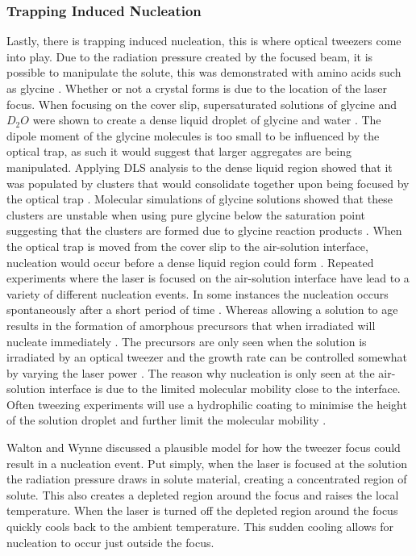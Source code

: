 \subsubsection{Trapping Induced Nucleation}
Lastly, there is trapping induced nucleation, this is where optical 
tweezers come into play. Due to the radiation pressure created by 
the focused beam, it is possible to manipulate the solute, this was 
demonstrated with amino acids such as glycine \cite{Tsuboi2009}. 
Whether or not a crystal forms is due to the location of the laser 
focus. When focusing on the cover slip, supersaturated solutions 
of glycine and $D_2O$ were shown to create a dense liquid droplet 
of glycine and water \cite{Yuyama2010, Yuyama2012}. The dipole 
moment of the glycine molecules is too small to be influenced by 
the optical trap, as such it would suggest that larger aggregates 
are being manipulated. Applying DLS analysis to the dense liquid 
region showed that it was populated by clusters that would 
consolidate together upon being focused by the optical trap 
\cite{Gowayed2021}. Molecular simulations of glycine solutions 
showed that these clusters are unstable when using pure glycine 
below the saturation point suggesting that the clusters are 
formed due to glycine reaction products \cite{Sweatman2022}. 
When the optical trap is moved from the cover slip to the 
air-solution interface, nucleation would occur before a dense 
liquid region could form \cite{Yuyama2010}. Repeated experiments 
where the laser is focused on the air-solution interface have 
lead to a variety of different nucleation events. In some 
instances the nucleation occurs spontaneously after a short 
period of time \cite{Yuyama2010}. Whereas allowing a solution to 
age results in the formation of amorphous precursors that when 
irradiated will nucleate immediately \cite{Liao2022}. The 
precursors are only seen when the solution is irradiated by an 
optical tweezer and the growth rate can be controlled somewhat 
by varying the laser power \cite{Liao2022}. The reason why 
nucleation is only seen at the air-solution interface is due 
to the limited molecular mobility close to the interface. 
Often tweezing experiments will use a hydrophilic coating to 
minimise the height of the solution droplet and further limit
the molecular mobility \cite{Yuyama2012, Gowayed2021}.

Walton and Wynne discussed a plausible model for how the tweezer 
focus could result in a nucleation event. Put simply, when the 
laser is focused at the solution the radiation pressure draws 
in solute material, creating a concentrated region of solute. 
This also creates a depleted region around the focus and raises 
the local temperature. When the laser is turned off the depleted 
region around the focus quickly cools back to the ambient 
temperature. This sudden cooling allows for nucleation to occur
just outside the focus.  

